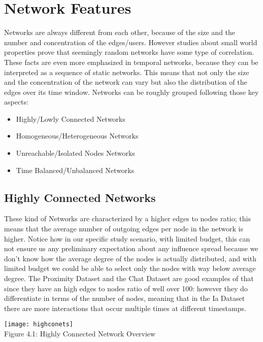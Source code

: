 \section{Network Features}
\label{sec:necfeats}
Networks are always different from each other, because of the size and the number and concentration of the edges/users. However studies about small world properties \cite{https://doi.org/10.48550/arxiv.2103.08035} prove that seemingly random networks have some type of correlation. These facts are even more emphasized in temporal networks, because they can be interpreted as a sequence of static networks. This means that not only the size and the concentration of the network can vary but also the distribution of the edges over its time window. Networks can be roughly grouped following those key aspects:
\begin{itemize}
\item Highly/Lowly Connected Networks
\item Homogeneous/Heterogeneous Networks
\item Unreachable/Isolated Nodes Networks
\item Time Balanced/Unbalanced Networks
\end{itemize}

\subsection{Highly Connected Networks}
\label{sec:hynets}
These kind of Networks are characterized by a higher edges to nodes ratio; this means that the average number of outgoing edges per node in the network is higher. Notice how in our specific study scenario, with limited budget, this can not ensure us any preliminary expectation about any influence spread because we don't know how the average degree of the nodes is actually distributed, and with limited budget we could be able to select only the nodes with way below average degree.  
The Proximity Dataset and the Chat Dataset are good examples of that since they have an high edges to nodes ratio of well over 100: however they do differentiate in terms of the number of nodes, meaning that in the Ia Dataset there are more interactions that occur multiple times at different timestamps. 
\begin{center}
    \texttt{[image: highconets]}
    \\
    Figure 4.1: Highly Connected Network Overview
\end{center}

